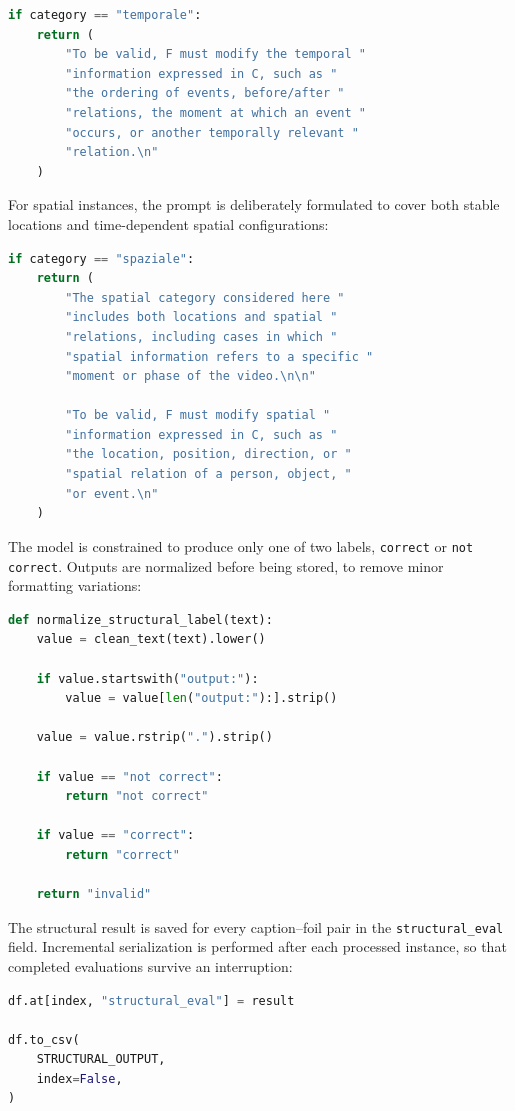 \begin{lstlisting}[language=Python]
if category == "temporale":
    return (
        "To be valid, F must modify the temporal "
        "information expressed in C, such as "
        "the ordering of events, before/after "
        "relations, the moment at which an event "
        "occurs, or another temporally relevant "
        "relation.\n"
    )
\end{lstlisting}
For spatial instances, the prompt is deliberately formulated to cover both stable locations and time-dependent spatial configurations:
\begin{lstlisting}[language=Python]
if category == "spaziale":
    return (
        "The spatial category considered here "
        "includes both locations and spatial "
        "relations, including cases in which "
        "spatial information refers to a specific "
        "moment or phase of the video.\n\n"

        "To be valid, F must modify spatial "
        "information expressed in C, such as "
        "the location, position, direction, or "
        "spatial relation of a person, object, "
        "or event.\n"
    )
\end{lstlisting}
The model is constrained to produce only one of two labels, \texttt{correct} or \texttt{not correct}. Outputs are normalized before being stored, to remove minor formatting variations:
\begin{lstlisting}[language=Python]
def normalize_structural_label(text):
    value = clean_text(text).lower()

    if value.startswith("output:"):
        value = value[len("output:"):].strip()

    value = value.rstrip(".").strip()

    if value == "not correct":
        return "not correct"

    if value == "correct":
        return "correct"

    return "invalid"
\end{lstlisting}
The structural result is saved for every caption--foil pair in the \texttt{structural\_eval} field. Incremental serialization is performed after each processed instance, so that completed evaluations survive an interruption:
\begin{lstlisting}[language=Python]
df.at[index, "structural_eval"] = result

df.to_csv(
    STRUCTURAL_OUTPUT,
    index=False,
)
\end{lstlisting}
